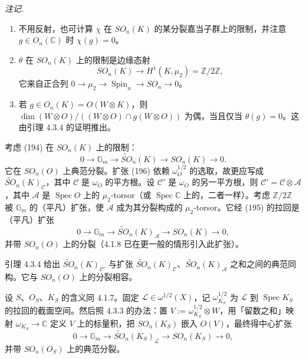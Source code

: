 \emph{注记.}
\begin{enumerate}[label=(\roman*),leftmargin=2.2em]
\item 不用反射，也可计算 $\chi$ 在 $SO_{n}(K)$ 的某分裂嘉当子群上的限制，并注意 $g\in O_{n}(\mathbb{C})$ 时 $\chi(g)=0$。
\item $\theta$ 在 $SO_{n}(K)$ 上的限制是边缘态射
\begin{equation}\tag{195}
SO_{n}(K)\to H^{1}(K,\mu_{2})=\mathbb{Z}/2\mathbb{Z},
\end{equation}
它来自正合列 $0\to\mu_{2}\to\operatorname{Spin}_{n}\to SO_{n}\to 0$。
\item 若 $g\in O_{n}(K)=O(W\otimes K)$，则 $\dim(W\otimes O)/((W\otimes O)\cap g(W\otimes O))$ 为偶，当且仅当 $\theta(g)=0$。这由引理 4.3.4 的证明推出。
\end{enumerate}

 考虑 (194) 在 $SO_{n}(K)$ 上的限制：
\begin{equation}\tag{196}
0\to\mathbb{G}_{m}\to\tilde{SO}_{n}(K)\to SO_{n}(K)\to 0.
\end{equation}
它在 $SO_{n}(O)$ 上典范分裂。扩张 (196) 依赖 $\omega_{O}^{1/2}$ 的选取，故更应写成 $\tilde{SO}_{n}(K)_{\mathcal{C}}$，其中 $\mathcal{C}$ 是 $\omega_{O}$ 的平方根。设 $\mathcal{C}'$ 是 $\omega_{O}$ 的另一平方根，则 $\mathcal{C}'=\mathcal{C}\otimes\mathcal{A}$，其中 $\mathcal{A}$ 是 $\operatorname{Spec} O$ 上的 $\mu_{2}$-torsor（或 $\operatorname{Spec}\mathbb{C}$ 上的，二者一样）。考虑 $\mathbb{Z}/2\mathbb{Z}$ 被 $\mathbb{G}_{m}$ 的（平凡）扩张，使 $\mathcal{A}$ 成为其分裂构成的 $\mu_{2}$-torsor。它经 (195) 的拉回是（平凡）扩张
\begin{equation}\tag{197}
0\to\mathbb{G}_{m}\to\tilde{SO}_{n}(K)_{\mathcal{A}}\to SO_{n}(K)\to 0,
\end{equation}
并带 $SO_{n}(O)$ 上的分裂（4.1.8 已在更一般的情形引入此扩张）。

引理 4.3.4 给出 $\tilde{SO}_{n}(K)_{\mathcal{C}'}$ 与扩张 $\tilde{SO}_{n}(K)_{\mathcal{C}}$、$\tilde{SO}_{n}(K)_{\mathcal{A}}$ 之和之间的典范同构。它与 $SO_{n}(O)$ 上的分裂相容。

 设 $S$、$O_{S}$、$K_{S}$ 的含义同 4.1.7。固定 $\mathcal{L}\in\omega^{1/2}(X)$，记 $\omega_{K_{S}}^{1/2}$ 为 $\mathcal{L}$ 到 $\operatorname{Spec} K_{S}$ 的拉回的截面空间。然后照 4.3.3 的办法：置 $V:=\omega_{K_{S}}^{1/2}\otimes W$，用「留数之和」映射 $\omega_{K_{S}}\to\mathbb{C}$ 定义 $V$ 上的标量积，把 $SO_{n}(K_{S})$ 嵌入 $O(V)$，最终得中心扩张
\begin{equation}\tag{198}
0\to\mathbb{G}_{m}\to\tilde{SO}_{n}(K_{S})_{\mathcal{L}}\to SO_{n}(K_{S})\to 0,
\end{equation}
并带 $SO_{n}(O_{S})$ 上的典范分裂。

